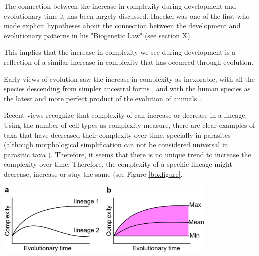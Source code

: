 \clearpage

\setcounter{figure}{2}%

\begin{mdframed}[style=boxstyle,frametitle={Box1. On the relationship between the increase of complexity in Evolution and Development}]\label{Box1:Evo_complexity}

The connection between the increase in complexity during development and evolutionary time it has been largely discussed.
Haeckel was one of the first who made explicit hypotheses about the connection between the development and evolutionary patterns in his "Biogenetic Law" (see section X).

This implies that the increase in complexity we see during development is a reflection of a similar increase in complexity that has occurred through evolution.

Early views of evolution saw the increase in complexity as inexorable, with all the species descending from simpler ancestral forms \citep{lamarck1809zoo,haeckel1874menschen}, and with the human species as the latest and more perfect product of the evolution of animals \citep{haeckel1874menschen}.


Recent views recognize that complexity of can increase or decrease in a lineage.
Using the number of cell-types as complexity measure, there are clear examples of taxa that have decreased their complexity over time, specially in parasites \citep{Canning2003,Arthur2010} (although morphological simplification can not be considered universal in parasitic taxa \citealp{poulin2011evolutionary}). Therefore, it seems that there is no unique trend to increase the complexity over time. Therefore, the complexity of a specific lineage might decrease, increase or stay the same (see Figure \ref{boxfigure}.
\par
{\centering
  \includegraphics[width=0.8\textwidth]{./Images/complexity_min.jpeg}
  \centering
\label{boxfigure}
}
\par


\end{mdframed}
